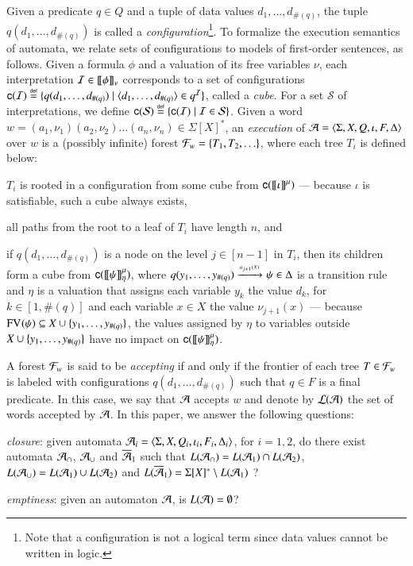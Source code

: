 \documentclass{llncs}
\begin{document}
Given a predicate $q \in Q$ and a tuple of data values
$d_1,\ldots,d_{\#(q)}$, the tuple $q(d_1,\ldots,d_{\#(q)})$ is called
a \emph{configuration}\footnote{Note that a configuration is not a
  logical term since data values cannot be written in logic.}. To
formalize the execution semantics of automata, we relate sets of
configurations to models of first-order sentences, as follows. Given a
formula $\phi$ and a valuation of its free variables $\nu$, each
interpretation $\mathcal{I} \in {\bf [\![} \phi {\bf ]\!]}_\nu$ corresponds to a set of
configurations $\mathsf{c}({\mathcal{I}}) \stackrel{\scriptscriptstyle{\mathsf{def}}}{=} \{ q(d_1,\ldots,d_{\#(q)}) \mid
  \langle d_1,\ldots,d_{\#(q)} \rangle \in q^{\mathcal{I}} \}$, called a \emph{cube}. For a
set $\mathcal{S}$ of interpretations, we define $\mathsf{c}({\mathcal{S}})
\stackrel{\scriptscriptstyle{\mathsf{def}}}{=} \{ \mathsf{c}({\mathcal{I}}) \mid \mathcal{I} \in \mathcal{S} \}$. Given a word
$w=(a_1,\nu_1)(a_2,\nu_2) \ldots (a_n,\nu_n) \in \Sigma[X]^*$, an
\emph{execution} of $\mathcal{A}=\langle \Sigma,X,Q,\iota,F,\Delta \rangle$ over $w$ is
a (possibly infinite) forest $\mathcal{F}_w = \{ T_1,T_2,\ldots \}$, where each
tree $T_i$ is defined below:
\begin{compactitem}
\item $T_i$ is rooted in a configuration from some cube from
  $\mathsf{c}({{\bf [\![} \iota {\bf ]\!]}^\mu})$ --- because $\iota$ is satisfiable, such a cube
  always exists,
%
\item all paths from the root to a leaf of $T_i$ have length $n$, and
%
\item if $q(d_1,\ldots,d_{\#(q)})$ is a node on the level $j \in
  [n-1]$ in $T_i$, then its children form a cube from
  $\mathsf{c}({{\bf [\![} \psi {\bf ]\!]}^\mu_\eta})$, where \(q(y_1,\ldots,y_{\#(q)})
  \xrightarrow{{\scriptscriptstyle a_{j+1}(X)}}_{{\scriptstyle }} \psi \in \Delta\) is a transition rule and
  $\eta$ is a valuation that assigns each variable $y_k$ the value
  $d_k$, for $k \in [1,\#(q)]$ and each variable $x \in X$ the value
  $\nu_{j+1}(x)$ --- because $\mathrm{FV}_{}(\psi) \subseteq X \cup
  \{ y_1,\ldots,y_{\#(q)} \}$, the values assigned by $\eta$ to
  variables outside $X \cup \{ y_1,\ldots,y_{\#(q)} \}$ have no impact
  on $\mathsf{c}({{\bf [\![} \psi {\bf ]\!]}^\mu_\eta})$.
\end{compactitem}
A forest $\mathcal{F}_w$ is said to be \emph{accepting} if and only if the
frontier of each tree $T \in \mathcal{F}_w$ is labeled with configurations
$q(d_1,\ldots,d_{\#(q)})$ such that $q \in F$ is a final predicate. In
this case, we say that $\mathcal{A}$ accepts $w$ and denote by ${\mathcal L}({\mathcal{A}})$ the
set of words accepted by $\mathcal{A}$. In this paper, we answer the following
questions: \begin{compactenum}
\item \emph{closure}: given automata $\mathcal{A}_i =
  \langle \Sigma,X,Q_i,\iota_i,F_i,\Delta_i \rangle$, for $i=1,2$, do there
  exist automata $\mathcal{A}_\cap$, $\mathcal{A}_\cup$ and $\overline{\mathcal{A}}_1$ such that
  $L(\mathcal{A}_\cap) = L(\mathcal{A}_1) \cap L(\mathcal{A}_2)$, $L(\mathcal{A}_\cup) = L(\mathcal{A}_1) \cup
  L(\mathcal{A}_2)$ and $L(\overline{\mathcal{A}}_1) = \Sigma[X]^* \setminus L(\mathcal{A}_1)$ ?
%
\item \emph{emptiness}: given an automaton $\mathcal{A}$, is $L(\mathcal{A}) =
  \emptyset$?
\end{compactenum}
\end{document}
